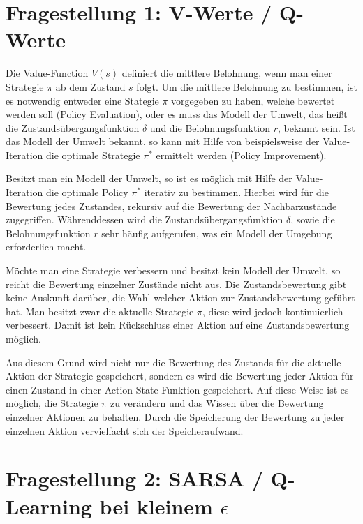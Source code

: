\documentclass[10pt]{scrartcl}
\author{Pascal Jäger, Stefan Münchow, Armin Steudte,\\ Milena Rötting, Svend-Anjes Pahl, Carsten Noetzel, Oliver Steenbuck}
\title{\titletext}
\date{01.06.2012}
\begin{document}
\maketitle

\setcounter{tocdepth}{3}
\tableofcontents
\listoffigures

\section{Fragestellung 1: V-Werte / Q-Werte}
Die Value-Function $V(s)$ definiert die mittlere Belohnung, wenn man einer Strategie $\pi$ ab dem Zustand $s$ folgt. Um die mittlere Belohnung zu bestimmen, ist es notwendig entweder eine Stategie $\pi$ vorgegeben zu haben, welche bewertet werden soll (Policy Evaluation), oder es muss das Modell der Umwelt, das heißt die Zustandsübergangsfunktion $\delta$ und die Belohnungsfunktion $r$, bekannt sein. Ist das Modell der Umwelt bekannt, so kann mit Hilfe von beispielsweise der Value-Iteration die optimale Strategie $\pi^*$ ermittelt werden (Policy Improvement).

Besitzt man ein Modell der Umwelt, so ist es möglich mit Hilfe der Value-Iteration die optimale Policy $\pi^*$ iterativ zu bestimmen. Hierbei wird für die Bewertung jedes Zustandes, rekursiv auf die Bewertung der Nachbarzustände zugegriffen. Währenddessen wird die Zustandsübergangsfunktion $\delta$, sowie die Belohnungsfunktion $r$ sehr häufig aufgerufen, was ein Modell der Umgebung erforderlich macht.

Möchte man eine Strategie verbessern und besitzt kein Modell der Umwelt, so reicht die Bewertung einzelner Zustände nicht aus. Die Zustandsbewertung gibt keine Auskunft darüber, die Wahl welcher Aktion zur Zustandsbewertung geführt hat. Man besitzt zwar die aktuelle Strategie $\pi$, diese wird jedoch kontinuierlich verbessert. Damit ist kein Rückschluss einer Aktion auf eine Zustandsbewertung möglich.

Aus diesem Grund wird nicht nur die Bewertung des Zustands für die aktuelle Aktion der Strategie gespeichert, sondern es wird die Bewertung jeder Aktion für einen Zustand in einer Action-State-Funktion gespeichert. Auf diese Weise ist es möglich, die Strategie $\pi$ zu verändern und das Wissen über die Bewertung einzelner Aktionen zu behalten. Durch die Speicherung der Bewertung zu jeder einzelnen Aktion vervielfacht sich der Speicheraufwand.

\section{Fragestellung 2: SARSA / Q-Learning bei kleinem $\epsilon$}
\end{document}
